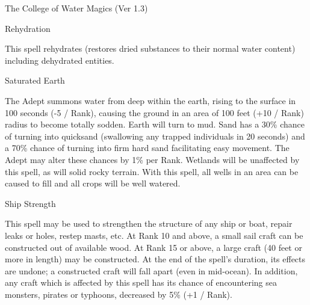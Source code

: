 \begin{Chapter}{The College of Water Magics (Ver 1.3)}
\begin{spell}[G-6]{Rehydration}
\begin{effects}
This spell rehydrates (restores dried substances to their normal
water content) including dehydrated entities.
\end{effects}
\end{spell}

\begin{spell}[G-7]{Saturated Earth}

\begin{effects}
The Adept summons water from deep within the earth, rising to the
surface in 100 seconds (-5 / Rank), causing the ground in an area of
100 feet (+10 / Rank) radius to become totally sodden.  Earth will
turn to mud.  Sand has a 30\% chance of turning into quicksand
(swallowing any trapped individuals in 20 seconds) and a 70\% chance
of turning into firm hard sand facilitating easy movement.  The Adept
may alter these chances by 1\% per Rank.  Wetlands will be unaffected
by this spell, as will solid rocky terrain.  With this spell, all
wells in an area can be caused to fill and all crops will be well
watered.
\end{effects}
\end{spell}

\begin{spell}[G-8]{Ship Strength}

\begin{effects}
This spell may be used to strengthen the structure of any ship or
boat, repair leaks or holes, restep masts, etc.  At Rank 10 and above,
a small sail craft can be constructed out of available wood.  At Rank
15 or above, a large craft (40 feet or more in length) may be
constructed.  At the end of the spell’s duration, its effects are
undone; a constructed craft will fall apart (even in mid-ocean). In
addition, any craft which is affected by this spell has its chance of
encountering sea monsters, pirates or typhoons, decreased by 5\% (+1 /
Rank).
\end{effects}
\end{spell}


\end{Chapter}
